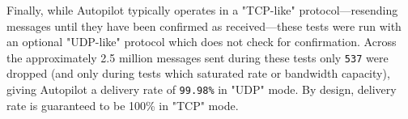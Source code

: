 Finally, while Autopilot typically operates in a "TCP-like" protocol---resending messages until they have been confirmed as received---these tests were run with an optional "UDP-like" protocol which does not check for confirmation. Across the approximately 2.5 million messages sent during these tests only \texttt{537} were dropped (and only during tests which saturated rate or bandwidth capacity), giving Autopilot a delivery rate of \texttt{99.98\%} in "UDP" mode. By design, delivery rate is guaranteed to be 100\% in "TCP" mode.